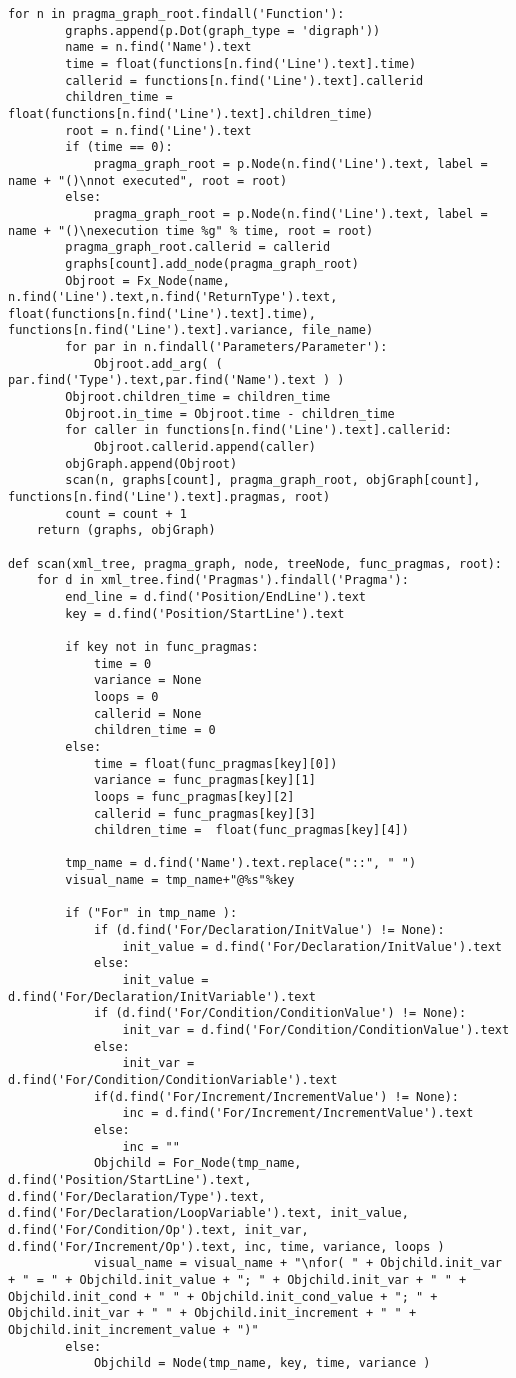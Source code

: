 \documentclass[a4paper,11pt,twoside]{book}
\begin{document}
\begin{lstlisting}[language=CCC, caption=pargraph.py]
	for n in pragma_graph_root.findall('Function'):
		graphs.append(p.Dot(graph_type = 'digraph'))
		name = n.find('Name').text
		time = float(functions[n.find('Line').text].time)
		callerid = functions[n.find('Line').text].callerid
		children_time = float(functions[n.find('Line').text].children_time)
		root = n.find('Line').text
		if (time == 0):
			pragma_graph_root = p.Node(n.find('Line').text, label = name + "()\nnot executed", root = root)
		else:
			pragma_graph_root = p.Node(n.find('Line').text, label = name + "()\nexecution time %g" % time, root = root)
		pragma_graph_root.callerid = callerid
		graphs[count].add_node(pragma_graph_root)
		Objroot = Fx_Node(name, n.find('Line').text,n.find('ReturnType').text, float(functions[n.find('Line').text].time), functions[n.find('Line').text].variance, file_name)
		for par in n.findall('Parameters/Parameter'):
			Objroot.add_arg( ( par.find('Type').text,par.find('Name').text ) )
		Objroot.children_time = children_time
		Objroot.in_time = Objroot.time - children_time
		for caller in functions[n.find('Line').text].callerid:
			Objroot.callerid.append(caller)
		objGraph.append(Objroot)
		scan(n, graphs[count], pragma_graph_root, objGraph[count], functions[n.find('Line').text].pragmas, root)
		count = count + 1
	return (graphs, objGraph)

def scan(xml_tree, pragma_graph, node, treeNode, func_pragmas, root):
	for d in xml_tree.find('Pragmas').findall('Pragma'):
		end_line = d.find('Position/EndLine').text
		key = d.find('Position/StartLine').text

		if key not in func_pragmas:
			time = 0
			variance = None
			loops = 0
			callerid = None
			children_time = 0
		else:
			time = float(func_pragmas[key][0])
			variance = func_pragmas[key][1]
			loops = func_pragmas[key][2]
			callerid = func_pragmas[key][3]
			children_time =  float(func_pragmas[key][4])

		tmp_name = d.find('Name').text.replace("::", " ")
		visual_name = tmp_name+"@%s"%key

		if ("For" in tmp_name ):
			if (d.find('For/Declaration/InitValue') != None):
				init_value = d.find('For/Declaration/InitValue').text
			else:
				init_value = d.find('For/Declaration/InitVariable').text
			if (d.find('For/Condition/ConditionValue') != None):
				init_var = d.find('For/Condition/ConditionValue').text
			else:
				init_var = d.find('For/Condition/ConditionVariable').text
			if(d.find('For/Increment/IncrementValue') != None):
				inc = d.find('For/Increment/IncrementValue').text
			else:
				inc = ""
			Objchild = For_Node(tmp_name, d.find('Position/StartLine').text, d.find('For/Declaration/Type').text, d.find('For/Declaration/LoopVariable').text, init_value, d.find('For/Condition/Op').text, init_var, d.find('For/Increment/Op').text, inc, time, variance, loops )
			visual_name = visual_name + "\nfor( " + Objchild.init_var + " = " + Objchild.init_value + "; " + Objchild.init_var + " " + Objchild.init_cond + " " + Objchild.init_cond_value + "; " + Objchild.init_var + " " + Objchild.init_increment + " " + Objchild.init_increment_value + ")"
		else:
			Objchild = Node(tmp_name, key, time, variance )


\end{lstlisting}
\end{document}
